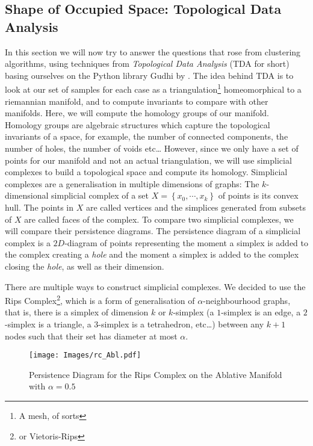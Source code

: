 
\subsection{Shape of Occupied Space: Topological Data Analysis}
In this section we will now try to answer the questions that rose from clustering algorithms, using techniques from \textit{Topological Data Analysis} (TDA for short) basing ourselves on the Python library Gudhi by . 
The idea behind TDA is to look at our set of samples for each case as a triangulation\footnote{A mesh, of sorts} homeomorphical to a riemannian manifold, and to compute invariants to compare with other manifolds. 
Here, we will compute the homology groups of our manifold. Homology groups are algebraic structures which capture the topological invariants of a space, for example, the number of connected components, the number of holes, the number of voids etc\ldots
However, since we only have a set of points for our manifold and not an actual triangulation, we will use simplicial complexes to build a topological space and compute its homology. 
Simplicial complexes are a generalisation in multiple dimensions of graphs:
The $k$-dimensional simplicial complex of a set $X = \left\{x_{0}, \cdots, x_{k}\right\}$ of points is its convex hull. The points in $X$ are called vertices and the simplices generated from subsets of $X$ are called faces of the complex. 
To compare two simplicial complexes, we will compare their persistence diagrams.
The persistence diagram of a simplicial complex is a $2D$-diagram of points representing the moment a simplex is added to the complex creating a \textit{hole} and the moment a simplex is added to the complex closing the \textit{hole}, as well as their dimension. 

There are multiple ways to construct simplicial complexes. 
We decided to use the Rips Complex\footnote{or Vietoris-Rips}, which is a form of generalisation of $\alpha$-neighbourhood graphs, that is, there is a simplex of dimension $k$ or $k$-simplex (a $1$-simplex is an edge, a $2$-simplex is a triangle, a $3$-simplex is a tetrahedron, etc\ldots) between any $k + 1$ nodes such that their set has diameter at most $\alpha$.

\begin{figure}[h]
    \centering
    \texttt{[image: Images/rc\_Abl.pdf]}
    \caption{Persistence Diagram for the Rips Complex on the Ablative Manifold with $\alpha = 0.5$}
    \label{fig:rcabl}
\end{figure}

